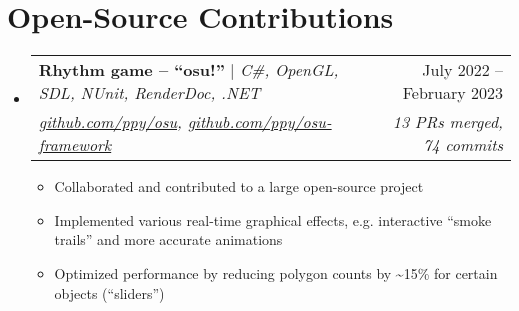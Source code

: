 \documentclass[letterpaper,11pt]{article}
\makeatletter
\newcommand{\resumeItem}[1]{
  \item\small{
    {#1 \vspace{-2pt}}
  }
}
\newcommand{\resumeOSSProjectHeading}[4]{
    \item
    \begin{tabular*}{0.97\textwidth}{l@{\extracolsep{\fill}}r}
      \small#1 & #2 \\
      \textit{\footnotesize #3} & \textit{\footnotesize #4} \\
    \end{tabular*}\vspace{-7pt}
}
\newcommand{\resumeSubHeadingListStart}{\begin{itemize}[leftmargin=0.15in, label={}]}
\newcommand{\resumeSubHeadingListEnd}{\end{itemize}}
\newcommand{\resumeItemListStart}{\begin{itemize}}
\newcommand{\resumeItemListEnd}{\end{itemize}\vspace{-5pt}}
\makeatother
\begin{document}
\section{Open-Source Contributions}
    \resumeSubHeadingListStart
        \resumeOSSProjectHeading
            {\textbf{Rhythm game -- ``osu!''} $|$ \emph{C\#, OpenGL, SDL, NUnit, RenderDoc, .NET}}{July 2022 -- February 2023}
            {\href{https://github.com/ppy/osu/pulls?q=is\%3Apr+author\%3Agoodtrailer+is\%3Aclosed}{github.com/ppy/osu}, \href{https://github.com/ppy/osu-framework/pulls?q=is\%3Apr+author\%3Agoodtrailer+is\%3Aclosed}{github.com/ppy/osu-framework}}{13 PRs merged, 74 commits}
            \resumeItemListStart
                \resumeItem{Collaborated and contributed to a large open-source project}
                \resumeItem{Implemented various real-time graphical effects, e.g. interactive ``smoke trails'' and more accurate animations}
                \resumeItem{Optimized performance by reducing polygon counts by \textasciitilde15\% for certain objects (``sliders'')}
        \resumeItemListEnd
    \resumeSubHeadingListEnd

\end{document}
